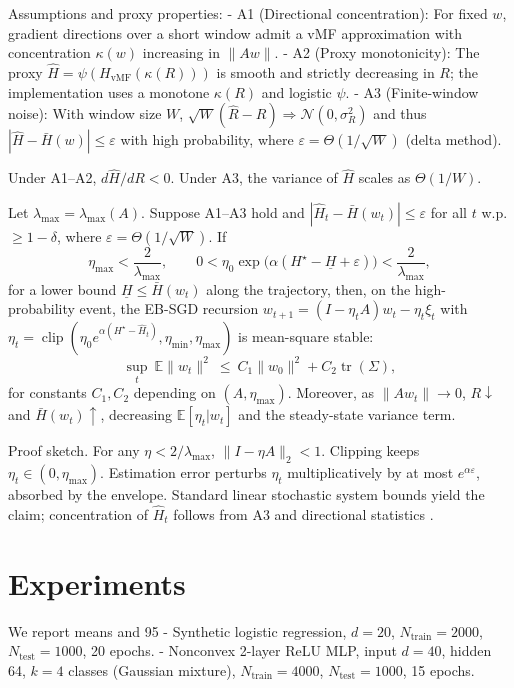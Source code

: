 Assumptions and proxy properties:
- A1 (Directional concentration): For fixed $w$, gradient directions over a short window admit a vMF approximation with concentration $\kappa(w)$ increasing in $\|Aw\|$.
- A2 (Proxy monotonicity): The proxy $\widehat{H}=\psi(H_{\text{vMF}}(\kappa(R)))$ is smooth and strictly decreasing in $R$; the implementation uses a monotone $\kappa(R)$ and logistic $\psi$.
- A3 (Finite-window noise): With window size $W$, $\sqrt{W}(\hat{R}-R)\Rightarrow\mathcal{N}(0,\sigma_R^2)$ and thus $|\widehat{H}-\bar{H}(w)|\le \varepsilon$ with high probability, where $\varepsilon=\Theta(1/\sqrt{W})$ (delta method).

\begin{lemma}
Under A1--A2, $d\widehat{H}/dR<0$. Under A3, the variance of $\widehat{H}$ scales as $\Theta(1/W)$.
\end{lemma}

\begin{theorem}
Let $\lambda_{\max}=\lambda_{\max}(A)$. Suppose A1--A3 hold and $|\widehat{H}_t-\bar{H}(w_t)|\le \varepsilon$ for all $t$ w.p. $\ge 1-\delta$, where $\varepsilon=\Theta(1/\sqrt{W})$. If
\[
\eta_{\max} < \frac{2}{\lambda_{\max}},\qquad
0< \eta_0 \exp\!\big(\alpha(H^\star - \underline{H} + \varepsilon)\big) < \frac{2}{\lambda_{\max}},
\]
for a lower bound $\underline{H}\le \bar{H}(w_t)$ along the trajectory, then, on the high-probability event, the EB-SGD recursion
$
w_{t+1}=(I-\eta_t A)w_t - \eta_t \xi_t
$
with $\eta_t=\operatorname{clip}\left(\eta_0 e^{\alpha(H^\star-\widehat{H}_t)},\eta_{\min},\eta_{\max}\right)$ is mean-square stable:
\[
\sup_t \ \mathbb{E}\|w_t\|^2 \ \le\ C_1 \|w_0\|^2 + C_2 \operatorname{tr}(\Sigma),
\]
for constants $C_1,C_2$ depending on $(A,\eta_{\max})$. Moreover, as $\|Aw_t\|\to 0$, $R\downarrow$ and $\bar{H}(w_t)\uparrow$, decreasing $\mathbb{E}[\eta_t|w_t]$ and the steady-state variance term.
\end{theorem}

Proof sketch. For any $\eta<2/\lambda_{\max}$, $\|I-\eta A\|_2<1$. Clipping keeps $\eta_t\in(0,\eta_{\max})$. Estimation error perturbs $\eta_t$ multiplicatively by at most $e^{\alpha \varepsilon}$, absorbed by the envelope. Standard linear stochastic system bounds yield the claim; concentration of $\widehat{H}_t$ follows from A3 and directional statistics \cite{MardiaJupp2000Directional}.

\section{Experiments}
We report means and 95%
- Synthetic logistic regression, $d{=}20$, $N_{\text{train}}{=}2000$, $N_{\text{test}}{=}1000$, 20 epochs.
- Nonconvex 2-layer ReLU MLP, input $d{=}40$, hidden 64, $k{=}4$ classes (Gaussian mixture), $N_{\text{train}}{=}4000$, $N_{\text{test}}{=}1000$, 15 epochs.

